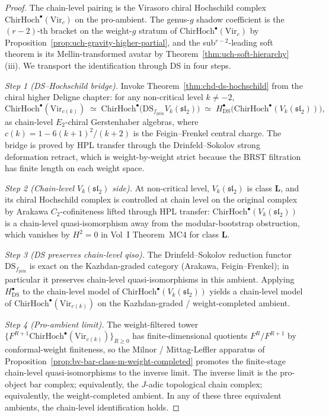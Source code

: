 \begin{proof}
The chain-level pairing is the Virasoro chiral Hochschild complex
$\mathrm{ChirHoch}^\bullet(\mathrm{Vir}_c)$ on the pro-ambient. The
genus-$g$ shadow coefficient is the $(r{-}2)$-th bracket on the
weight-$g$ stratum of $\mathrm{ChirHoch}^\bullet(\mathrm{Vir}_c)$ by
Proposition~\ref{prop:uch-gravity-higher-partial}, and the
sub${}^{r-2}$-leading soft theorem is its Mellin-transformed avatar
by Theorem~\ref{thm:uch-soft-hierarchy}\,(iii). We transport the
identification through DS in four steps.

\emph{Step 1 (DS--Hochschild bridge).} Invoke
Theorem~\ref{thm:chd-ds-hochschild} from the chiral higher Deligne
chapter: for any non-critical level $k \neq -2$,
\[
\mathrm{ChirHoch}^\bullet(\mathrm{Vir}_{c(k)})
\;\simeq\;
\mathrm{ChirHoch}^\bullet\!\bigl(\mathrm{DS}_{f_{\mathrm{prin}}} V_k(\mathfrak{sl}_2)\bigr)
\;\simeq\;
H^\bullet_{\mathrm{DS}}\!\bigl(\mathrm{ChirHoch}^\bullet(V_k(\mathfrak{sl}_2))\bigr),
\]
as chain-level $E_2$-chiral Gerstenhaber algebras, where
$c(k) = 1 - 6(k+1)^2/(k+2)$ is the Feigin--Frenkel central charge.
The bridge is proved by HPL transfer through the Drinfeld--Sokolov
strong deformation retract, which is weight-by-weight strict because
the BRST filtration has finite length on each weight space.

\emph{Step 2 (Chain-level $V_k(\mathfrak{sl}_2)$ side).} At
non-critical level, $V_k(\mathfrak{sl}_2)$ is class $\mathbf L$, and its
chiral Hochschild complex is controlled at chain level on the original
complex by Arakawa $C_2$-cofiniteness lifted through HPL transfer:
$\mathrm{ChirHoch}^\bullet(V_k(\mathfrak{sl}_2))$ is a chain-level
quasi-isomorphism away from the modular-bootstrap obstruction, which
vanishes by $H^2 = 0$ in Vol~I Theorem~MC4 for class $\mathbf L$.

\emph{Step 3 (DS preserves chain-level qiso).} The Drinfeld--Sokolov
reduction functor $\mathrm{DS}_{f_{\mathrm{prin}}}$ is exact on the
Kazhdan-graded category (Arakawa, Feigin--Frenkel); in particular it
preserves chain-level quasi-isomorphisms in this ambient. Applying
$H^\bullet_{\mathrm{DS}}$ to the chain-level model of
$\mathrm{ChirHoch}^\bullet(V_k(\mathfrak{sl}_2))$ yields a chain-level
model of $\mathrm{ChirHoch}^\bullet(\mathrm{Vir}_{c(k)})$ on the
Kazhdan-graded / weight-completed ambient.

\emph{Step 4 (Pro-ambient limit).} The weight-filtered tower
$\{F^{R+1}\mathrm{ChirHoch}^\bullet(\mathrm{Vir}_{c(k)})\}_{R \geq 0}$
has finite-dimensional quotients $F^{R} / F^{R+1}$ by
conformal-weight finiteness, so the Milnor / Mittag-Leffler apparatus
of Proposition~\ref{prop:bv-bar-class-m-weight-completed} promotes
the finite-stage chain-level quasi-isomorphisms to the inverse limit.
The inverse limit is the pro-object bar complex; equivalently, the
$J$-adic topological chain complex; equivalently, the weight-completed
ambient. In any of these three equivalent ambients, the chain-level
identification holds.


\end{proof}
